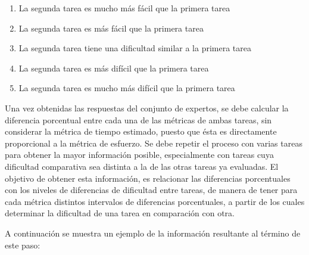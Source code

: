 \documentclass[letterpaper,12pt]{article}
\begin{document}
\begin{enumerate}
  \item La segunda tarea es mucho más fácil que la primera tarea
  \item La segunda tarea es más fácil que la primera tarea
  \item La segunda tarea tiene una dificultad similar a la primera tarea
  \item La segunda tarea es más difícil que la primera tarea
  \item La segunda tarea es mucho más difícil que la primera tarea
\end{enumerate}

Una vez obtenidas las respuestas del conjunto de expertos, se debe calcular la diferencia porcentual entre cada una de las métricas de ambas tareas, sin considerar la métrica de tiempo estimado, puesto que ésta es directamente proporcional a la métrica de esfuerzo. Se debe repetir el proceso con varias tareas para obtener la mayor información posible, especialmente con tareas cuya dificultad comparativa sea distinta a la de las otras tareas ya evaluadas. El objetivo de obtener esta información, es relacionar las diferencias porcentuales con los niveles de diferencias de dificultad entre tareas, de manera de tener para cada métrica distintos intervalos de diferencias porcentuales, a partir de los cuales determinar la dificultad de una tarea en comparación con otra.

A continuación se muestra un ejemplo de la información resultante al término de este paso:
\end{document}
